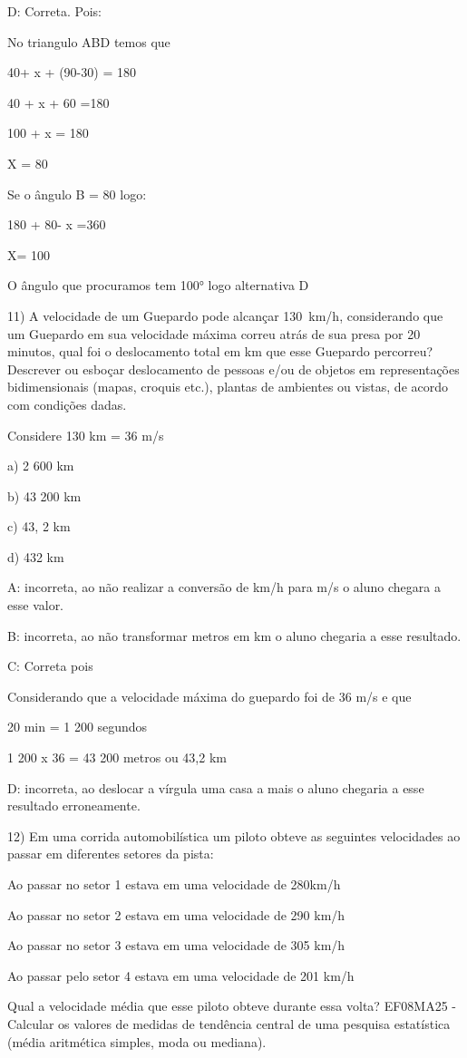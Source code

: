 D: Correta. Pois:

No triangulo ABD temos que

40+ x + (90-30) = 180

40 + x + 60 =180

100 + x = 180

X = 80

Se o ângulo B = 80 logo:

180 + 80- x =360

X= 100

O ângulo que procuramos tem 100° logo alternativa D

11) A velocidade de um Guepardo pode alcançar 130~km/h, considerando que
um Guepardo em sua velocidade máxima correu atrás de sua presa por 20
minutos, qual foi o deslocamento total em km que esse Guepardo
percorreu? Descrever ou esboçar deslocamento de pessoas e/ou de objetos
em representações bidimensionais (mapas, croquis etc.), plantas de
ambientes ou vistas, de acordo com condições dadas.

Considere 130 km = 36 m/s

a) 2 600 km

b) 43 200 km

c) 43, 2 km

d) 432 km

A: incorreta, ao não realizar a conversão de km/h para m/s o aluno
chegara a esse valor.

B: incorreta, ao não transformar metros em km o aluno chegaria a esse
resultado.

C: Correta pois

Considerando que a velocidade máxima do guepardo foi de 36 m/s e que

20 min = 1 200 segundos

1 200 x 36 = 43 200 metros ou 43,2 km

D: incorreta, ao deslocar a vírgula uma casa a mais o aluno chegaria a
esse resultado erroneamente.

12) Em uma corrida automobilística um piloto obteve as seguintes
velocidades ao passar em diferentes setores da pista:

Ao passar no setor 1 estava em uma velocidade de 280km/h

Ao passar no setor 2 estava em uma velocidade de 290 km/h

Ao passar no setor 3 estava em uma velocidade de 305 km/h

Ao passar pelo setor 4 estava em uma velocidade de 201 km/h

Qual a velocidade média que esse piloto obteve durante essa volta?
EF08MA25 - Calcular os valores de medidas de tendência central de uma
pesquisa estatística (média aritmética simples, moda ou mediana).

